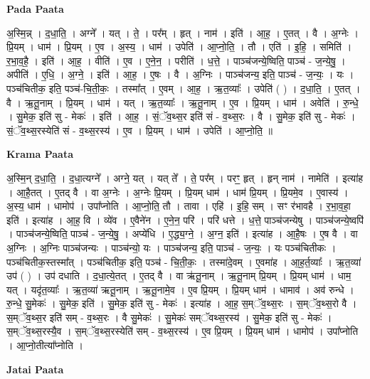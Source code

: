 \documentclass[17pt]{extarticle}
\begin{document}
\textbf{Pada Paata} \newline

अ॒स्मि॒न्न् । द॒धा॒ति॒ । अग्ने᳚ । यत् । ते॒ । पर᳚म् । हृत् । नाम॑ । इति॑ । आ॒ह॒ । ए॒तत् । वै । अ॒ग्नेः । प्रि॒यम् । धाम॑ । प्रि॒यम् । ए॒व । अ॒स्य॒ । धाम॑ । उपेति॑ । आ॒प्नो॒ति॒ । तौ । एति॑ । इ॒हि॒ । समिति॑ । र॒भा॒व॒है॒ । इति॑ । आ॒ह॒ । वीति॑ । ए॒व । ए॒ने॒न॒ । परीति॑ । ध॒त्ते॒ । पाञ्च॑जन्ये॒ष्विति॒ पाञ्च॑ - ज॒न्ये॒षु॒ । अपीति॑ । ए॒धि॒ । अ॒ग्ने॒ । इति॑ । आ॒ह॒ । ए॒षः । वै । अ॒ग्निः । पाञ्च॑जन्य॒ इति॒ पाञ्च॑ - ज॒न्यः॒ । यः । पञ्च॑चितीक॒ इति॒ पञ्च॑-चि॒ती॒कः॒ । तस्मा᳚त् । ए॒वम् । आ॒ह॒ । ऋ॒त॒व्याः᳚ । उपेति॑ ( ) । द॒धा॒ति॒ । ए॒तत् । वै । ऋ॒तू॒नाम् । प्रि॒यम् । धाम॑ । यत् । ऋ॒त॒व्याः᳚ । ऋ॒तू॒नाम् । ए॒व । प्रि॒यम् । धाम॑ । अवेति॑ । रु॒न्धे॒ । सु॒मेक॒ इति॑ सु - मेकः॑ । इति॑ । आ॒ह॒ । सं॒ॅव॒थ्स॒र इति॑ सं - व॒थ्स॒रः । वै । सु॒मेक॒ इति॑ सु - मेकः॑ । सं॒ॅव॒थ्स॒रस्येति॑ सं - व॒थ्स॒रस्य॑ । ए॒व । प्रि॒यम् । धाम॑ । उपेति॑ । आ॒प्नो॒ति॒ ॥  \newline


\textbf{Krama Paata} \newline

अ॒स्मि॒न् द॒धा॒ति॒ । द॒धा॒त्यग्ने᳚ । अग्ने॒ यत् । यत् ते᳚ । ते॒ पर᳚म् । परꣳ॒॒ हृत् । हृन् नाम॑ । नामेति॑ । इत्या॑ह । आ॒है॒तत् । ए॒तद् वै । वा अ॒ग्नेः । अ॒ग्नेः प्रि॒यम् । प्रि॒यम् धाम॑ । धाम॑ प्रि॒यम् । प्रि॒यमे॒व । ए॒वास्य॑ । अ॒स्य॒ धाम॑ । धामोप॑ । उपा᳚प्नोति । आ॒प्नो॒ति॒ तौ । तावा । एहि॑ । इ॒हि॒ सम् । सꣳ र॑भावहै । र॒भा॒व॒हा॒ इति॑ । इत्या॑ह । आ॒ह॒ वि । व्ये॑व । ए॒वैने॑न । ए॒ने॒न॒ परि॑ । परि॑ धत्ते । ध॒त्ते॒ पाञ्च॑जन्येषु । पाञ्च॑जन्ये॒ष्वपि॑ । पाञ्च॑जन्ये॒ष्विति॒ पाञ्च॑ - ज॒न्ये॒षु॒ । अप्ये॑धि । ए॒द्ध्य॒ग्ने॒ । अ॒ग्न॒ इति॑ । इत्या॑ह । आ॒है॒षः । ए॒ष वै । वा अ॒ग्निः । अ॒ग्निः पाञ्च॑जन्यः । पाञ्च॑न्यो॒ यः । पाञ्च॑जन्य॒ इति॒ पाञ्च॑ - ज॒न्यः॒ । यः पञ्च॑चितीकः । पञ्च॑चितीक॒स्तस्मा᳚त् । पञ्च॑चितीक॒ इति॒ पञ्च॑ - चि॒ती॒कः॒ । तस्मा॑दे॒वम् । ए॒वमा॑ह । आ॒ह॒र्त॒व्याः᳚ । ऋ॒त॒व्या॑ उप॑ ( ) । उप॑ दधाति । द॒धा॒त्ये॒तत् । ए॒तद् वै । वा ऋ॑तू॒नाम् । ऋ॒तू॒नाम् प्रि॒यम् । प्रि॒यम् धाम॑ । धाम॒ यत् । यदृ॑त॒व्याः᳚ । ऋ॒त॒व्या॑ ऋतू॒नाम् । ऋ॒तू॒नामे॒व । ए॒व प्रि॒यम् । प्रि॒यम् धाम॑ । धामाव॑ । अव॑ रुन्धे । रु॒न्धे॒ सु॒मेकः॑ । सु॒मेक॒ इति॑ । सु॒मेक॒ इति॑ सु - मेकः॑ । इत्या॑ह । आ॒ह॒ स॒म्ॅव॒थ्स॒रः । स॒म्ॅव॒थ्स॒रो वै । स॒म्ॅव॒थ्स॒र इति॑ सम् - व॒थ्स॒रः । वै सु॒मेकः॑ । सु॒मेकः॑ सम्ॅवथ्स॒रस्य॑ । सु॒मेक॒ इति॑ सु - मेकः॑ । स॒म्ॅव॒थ्स॒रस्यै॒व । स॒म्ॅव॒थ्स॒रस्येति॑ सम् - व॒थ्स॒रस्य॑ । ए॒व प्रि॒यम् । प्रि॒यम् धाम॑ । धामोप॑ । उपा᳚प्नोति । आ॒प्नो॒तीत्या᳚प्नोति । \newline

\textbf{Jatai Paata} \newline
\end{document}
